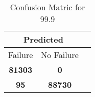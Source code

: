 \begin{table}[] 
\caption{Confusion Matric for 99.9} 
\label{Table: Prediction Accuracy-DMD99.9OnlySunEKF-ignoreReflectionperfectNoFailurePrediction-Reflection} 
\centering 
\begin{tabular} 
 {@{}ccc@{}} 
\toprule 
\multicolumn{2}{c}{\textbf{Predicted}}
 \\ \midrule 
\multicolumn{1}{|c|}{Failure} & 
\multicolumn{1}{c|}{No Failure}
 \\ \midrule 
\multicolumn{1}{|c|}{\color{green}\textbf{81303}} & 
\multicolumn{1}{c|}{\color{red}\textbf{0}}
 \\ \midrule 
\multicolumn{1}{|c|}{\color{red}\textbf{95}} & 
\multicolumn{1}{c|}{\color{green}\textbf{88730}}
 \\ \bottomrule 
\end{tabular} 
\end{table} 
